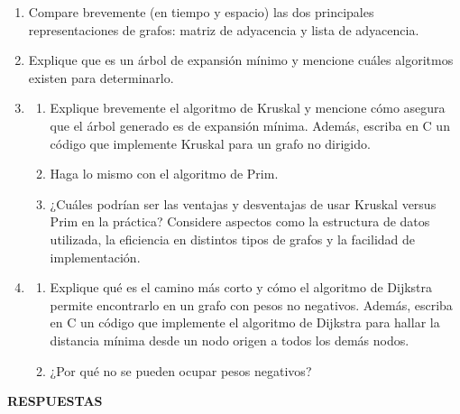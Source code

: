 \documentclass[12pt]{article}
\begin{document}
\begin{titlepage}
\begin{enumerate}[leftmargin=*]
            \item Compare brevemente (en tiempo y espacio) las dos principales representaciones de grafos: matriz de adyacencia y lista de adyacencia.

            \item Explique que es un árbol de expansión mínimo y mencione cuáles algoritmos existen para determinarlo.

            \item 
            \begin{enumerate}[label=\alph*)]
                \item Explique brevemente el algoritmo de Kruskal y mencione cómo asegura que el árbol generado es de expansión mínima. Además, escriba en C un código que implemente Kruskal para un grafo no dirigido.
                \item Haga lo mismo con el algoritmo de Prim.
                \item ¿Cuáles podrían ser las ventajas y desventajas de usar Kruskal versus Prim en la práctica? Considere aspectos como la estructura de datos utilizada, la eficiencia en distintos tipos de grafos y la facilidad de implementación.
            \end{enumerate}

            \item 
            \begin{enumerate}[label=\alph*)]
                \item Explique qué es el camino más corto y cómo el algoritmo de Dijkstra permite encontrarlo en un grafo con pesos no negativos. Además, escriba en C un código que implemente el algoritmo de Dijkstra para hallar la distancia mínima desde un nodo origen a todos los demás nodos.
                \item ¿Por qué no se pueden ocupar pesos negativos?
            \end{enumerate}
        \end{enumerate}
    \end{titlepage}

    \newpage
        \begin{center}
            \textbf{RESPUESTAS}
        \end{center}
\end{document}
